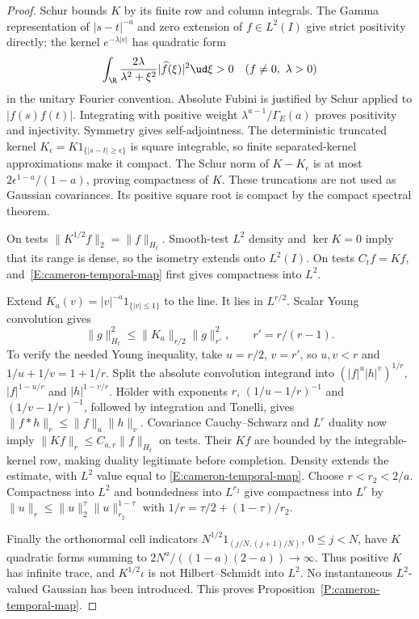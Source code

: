 \begin{proof}
  Schur bounds $K$ by its finite row and column integrals.
  The Gamma representation of $|s-t|^{-a}$ and zero extension
  of $f\in L^2(I)$ give strict positivity directly:
  the kernel $e^{-\lambda|v|}$ has quadratic form
  \[
    \int_\R\frac{2\lambda}{\lambda^2+\xi^2}
    |\widehat f(\xi)|^2\ud\xi>0
    \quad(f\ne0,\ \lambda>0)
  \]
  in the unitary Fourier convention.
  Absolute Fubini is justified by Schur applied to $|f(s)f(t)|$.
  Integrating with positive weight
  $\lambda^{a-1}/\Gamma_E(a)$ proves positivity and injectivity.
  Symmetry gives self-adjointness.
  The deterministic truncated kernel
  $K_\epsilon=K1_{\{|s-t|\ge\epsilon\}}$ is square integrable,
  so finite separated-kernel approximations make it compact.
  The Schur norm of $K-K_\epsilon$ is at most
  $2\epsilon^{1-a}/(1-a)$, proving compactness of $K$.
  These truncations are not used as Gaussian covariances.
  Its positive square root is compact by the compact spectral theorem.

  On tests $\|K^{1/2}f\|_2=\|f\|_{H_t}$.
  Smooth-test $L^2$ density and $\ker K=0$ imply that its range
  is dense, so the isometry extends onto $L^2(I)$.
  On tests $C_tf=Kf$, and~\eqref{E:cameron-temporal-map}
  first gives compactness into $L^2$.

  Extend $K_a(v)=|v|^{-a}1_{\{|v|\le1\}}$ to the line.
  It lies in $L^{r/2}$. Scalar Young convolution gives
  \[
    \|g\|_{H_t}^2\le\|K_a\|_{r/2}\|g\|_{r'}^2,\qquad
    r'=r/(r-1).
  \]
  To verify the needed Young inequality, take $u=r/2$, $v=r'$,
  so $u,v<r$ and $1/u+1/v=1+1/r$.
  Split the absolute convolution integrand into
  $(|f|^u|h|^v)^{1/r}$, $|f|^{1-u/r}$ and $|h|^{1-v/r}$.
  H\"older with exponents $r$, $(1/u-1/r)^{-1}$ and
  $(1/v-1/r)^{-1}$, followed by integration and Tonelli, gives
  $\|f*h\|_r\le\|f\|_u\|h\|_v$.
  Covariance Cauchy--Schwarz and $L^r$ duality now imply
  $\|Kf\|_r\le C_{a,r}\|f\|_{H_t}$ on tests.
  Their $Kf$ are bounded by the integrable-kernel row, making
  duality legitimate before completion.
  Density extends the estimate, with $L^2$ value equal to
  \eqref{E:cameron-temporal-map}.
  Choose $r<r_2<2/a$. Compactness into $L^2$ and boundedness
  into $L^{r_2}$ give compactness into $L^r$ by
  $\|u\|_r\le\|u\|_2^\tau\|u\|_{r_2}^{1-\tau}$ with
  $1/r=\tau/2+(1-\tau)/r_2$.

  Finally the orthonormal cell indicators
  $N^{1/2}1_{(j/N,(j+1)/N)}$, $0\le j<N$, have $K$ quadratic
  forms summing to
  $2N^a/((1-a)(2-a))\to\infty$.
  Thus positive $K$ has infinite trace, and $K^{1/2}\iota$
  is not Hilbert--Schmidt into $L^2$.
  No instantaneous $L^2$-valued Gaussian has been introduced.
  This proves Proposition~\ref{P:cameron-temporal-map}.
\end{proof}


